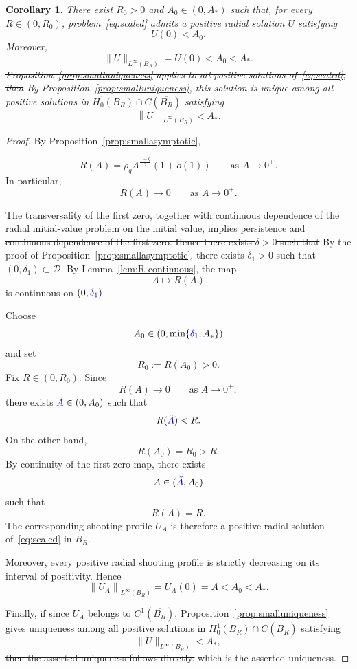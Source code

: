 \documentclass[11pt]{article}
\newcommand{\norm}[1]{\left\|#1\right\|}
\newcommand{\add}[1]{{\color{blue}#1}}
\newcommand{\del}[1]{{\color{red}\sout{#1}}}
\newcommand{\oldrev}[1]{#1}
\newtheorem{corollary}[theorem]{Corollary}
\theoremstyle{definition}
\begin{document}
\begin{corollary}
\label{cor:smallbranch}
There exist $R_0>0$ and $A_0\in(0,A_*)$ such that, for every
$R\in(0,R_0)$, problem~\eqref{eq:scaled} admits a positive radial
solution \oldrev{$U$ satisfying}
\[
\oldrev{U(0)<A_0.}
\]
\oldrev{Moreover,
\[
\|U\|_{L^\infty(B_R)}=U(0)<A_0<A_*.
\]}
\del{Proposition~\ref{prop:smalluniqueness} applies to
all positive solutions of~\eqref{eq:scaled}, then}
\add{By Proposition~\ref{prop:smalluniqueness},} this solution is
unique among all positive solutions \add{in
$H_0^1(B_R)\cap C(\overline{B_R})$} satisfying
\[
\norm{U}_{L^\infty(B_R)}<A_*.
\]
\end{corollary}

\begin{proof}
By Proposition~\ref{prop:smallasymptotic},
\oldrev{
\[
R(A)
=
\rho_q A^{\frac{1-q}{2}}(1+o(1))
\qquad\text{as }A\to0^+.
\]
In particular,}
\[
R(A)\to0
\qquad\text{as }A\to0^+.
\]

\del{The transversality of the first zero, together with
continuous dependence of the radial initial-value problem
on the initial value, implies persistence and
continuous dependence of the first zero. Hence there exists
$\delta>0$ such that}
\add{By the proof of Proposition~\ref{prop:smallasymptotic}, there
exists $\delta_1>0$ such that $(0,\delta_1)\subset\mathcal D$. By
Lemma~\ref{lem:R-continuous}, the map}
\[
A\longmapsto R(A)
\]
is continuous on $(0,\add{\delta_1})$.

\oldrev{Choose
\[
A_0\in(0,\min\{\add{\delta_1},A_*\})
\]
and set
\[
R_0:=R(A_0)>0.
\]
Fix $R\in(0,R_0)$. Since
\[
R(A)\to0
\qquad\text{as }A\to0^+,
\]
there exists $\add{\tilde A}\in(0,A_0)$ such that
\[
R(\add{\tilde A})<R.
\]
On the other hand,
\[
R(A_0)=R_0>R.
\]
By continuity of the first-zero map, there exists
\[
A\in(\add{\tilde A},A_0)
\]
such that
\[
R(A)=R.
\]}
The corresponding shooting profile $U_A$ is therefore a positive
radial solution of~\eqref{eq:scaled}
\oldrev{in $B_R$}.

\oldrev{Moreover,} every positive radial shooting profile is
strictly decreasing \oldrev{on its interval of positivity}.
Hence
\[
\norm{U_A}_{L^\infty(B_R)}
=
U_A(0)
\oldrev{=A<A_0}<A_*.
\]

Finally, \del{if}
\add{since $U_A$ belongs to $C^1(\overline{B_R})$,}
Proposition~\ref{prop:smalluniqueness}
gives uniqueness among all positive solutions \add{in
$H_0^1(B_R)\cap C(\overline{B_R})$} satisfying
\[
\|U\|_{L^\infty(B_R)}<A_*,
\]
\del{then the asserted uniqueness follows directly.}
\add{which is the asserted uniqueness.}
\end{proof}
\end{document}
